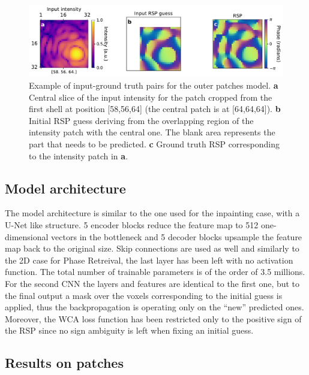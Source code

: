 \begin{figure}[H]
    \centering
    \includegraphics[width=\textwidth]{figures/Phasing/guess_RSP.pdf}
    \caption{Example of input-ground truth pairs for the outer patches model. \textbf{a} Central slice of the input intensity 
    for the patch cropped from the first shell at position [58,56,64] (the central patch is at [64,64,64]). \textbf{b} Initial 
    RSP guess deriving from the overlapping region of the intensity patch with the central one. The blank area represents 
    the part that needs to be predicted. \textbf{c} Ground truth RSP corresponding to the intensity patch in \textbf{a}.}
    
    \label{fig:patches_Xy}

\end{figure}

\subsection{Model architecture}\label{chp:3d_patch_model} 
The model architecture is similar to the one used for the inpainting case, with a U-Net like structure. 
5 encoder blocks reduce the feature map to 512 one-dimensional vectors in the bottleneck and 5 decoder blocks upsample 
the feature map back to the original size. Skip connections are used as well and similarly to the 2D case for Phase Retreival, 
the last layer has been left with no activation function. The total number of trainable parameters is of the order of 3.5 millions. \\
For the second CNN the layers and features are identical to the first one, but to the final output a mask over the 
voxels corresponding to the initial guess is applied, thus the backpropagation is operating only on the ``new'' predicted ones. 
Moreover, the WCA loss function has been restricted only to the positive sign of the RSP since no sign ambiguity is left 
when fixing an initial guess. 

\subsection{Results on patches}

